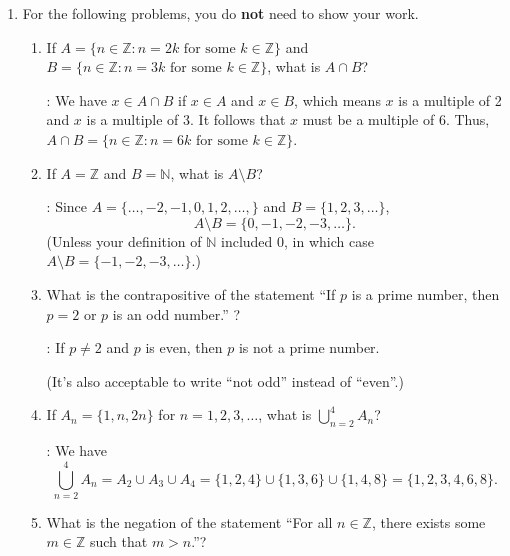 \documentclass[12pt]{article}
\newcommand{\points}[1]{\marginpar{\hspace{24pt}[#1]}}
\newcommand{\N}{\mathbb{N}}
\newcommand{\Z}{\mathbb{Z}}
\begin{document}
\begin{enumerate}
\begin{enumerate}
\end{enumerate}
\newpage

\item For the following problems, you do {\bf not} need to show your work.
\begin{enumerate}
\item If $A = \{n\in\Z : n=2k \text{ for some } k\in\Z\}$ and $B = \{n\in\Z : n=3k \text{ for some } k\in\Z\}$, what is $A\cap B$? \points{2}


\bigskip

: We have $x\in A\cap B$ if $x\in A$ and $x\in B$, which means $x$ is a multiple of 2 and $x$ is a multiple of $3$. It follows that $x$ must be a multiple of 6. Thus, $A\cap B = \{n\in\Z : n=6k \text{ for some } k\in\Z\}$.

\bigskip


\item If $A= \Z$ and $B=\N$, what is $A\setminus B$?\points{2}


\bigskip

: Since $A = \{\ldots, -2, -1, 0, 1, 2, \ldots, \}$ and $B = \{1,2,3,\ldots\}$, 
\[
A\setminus B = \{0,-1,-2,-3,\ldots\}.
\]
(Unless your definition of $\N$ included 0, in which case $A\setminus B = \{-1, -2, -3, \ldots\}$.)

\bigskip


\item What is the contrapositive of the statement ``If $p$ is a prime number, then $p=2$ or $p$ is an odd number.'' ?\points{2}


\bigskip

: If $p\neq 2$ and $p$ is even, then $p$ is not a prime number.

(It's also acceptable to write ``not odd'' instead of ``even''.)

\bigskip


\item If $A_n = \{1,n,2n\}$ for $n=1,2,3,\ldots$, what is $\displaystyle \bigcup_{n=2}^4 A_n$? \points{2}


\bigskip

: We have
\[
 \bigcup_{n=2}^4 A_n=A_2\cup A_3\cup A_4 = \{1,2,4\}\cup \{1,3,6\}\cup\{1,4,8\} = \{1,2,3,4,6,8\}.
\]


\bigskip


\item What is the negation of the statement ``For all $n\in\Z$, there exists some $m\in \Z$ such that $m>n$.''? \points{2}



\end{enumerate}
\end{enumerate}
\end{document}
